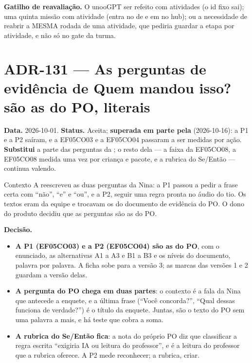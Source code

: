 \textbf{Gatilho de reavaliação.} O unooGPT ser refeito com atividades (o id fixo
 sai); uma quinta missão com atividade (entra no  de
 e em  no hub); ou a
necessidade de reabrir a MESMA rodada de uma atividade, que pediria guardar a
etapa por atividade, e não só no gate da turma.

\section{ADR-131 --- As perguntas de evidência de Quem mandou isso? são as do PO, literais}
\label{adr:perguntas-do-po-quem-mandou}

\textbf{Data.} 2026-10-01. \textbf{Status.} Aceita; \textbf{superada em parte
pela } (2026-10-16): a P1 e a P2 saíram, e a EF05CO03 e a
EF05CO04 passaram a ser medidas por ação. \textbf{Substitui} a parte
das perguntas da ; o resto dela --- a faixa da EF05CO08, a
EF05CO08 medida uma vez por criança e pacote, e a rubrica do Se/Então --- continua
valendo.

\begin{especificacao}{Contexto}
A  reescreveu as duas perguntas da Nina: a P1 passou a pedir a
frase certa com \enquote{não}, \enquote{e} e \enquote{ou}, e a P2, seguir uma
regra pronta no áudio do tio. Os textos eram da equipe e trocavam os do
documento de evidência do PO. O dono do produto decidiu que as perguntas são
as do PO.
\end{especificacao}

\textbf{Decisão.}

\begin{itemize}
  \item \textbf{A P1 (EF05CO03) e a P2 (EF05CO04) são as do PO}, com o
    enunciado, as alternativas A1 a A3 e B1 a B3 e os níveis do documento,
    palavra por palavra. A ficha sobe para a versão 3; as marcas das versões 1
    e 2 guardam a versão delas.
  \item \textbf{A pergunta do PO chega em duas partes}: o contexto é a fala da
    Nina que antecede a enquete, e a última frase (\enquote{Você concorda?},
    \enquote{Qual dessas funciona de verdade?}) é o título da enquete. Juntas,
    são o texto do PO sem uma palavra a mais, e há teste que cobra a soma.
  \item \textbf{A rubrica do Se/Então fica}: a nota do próprio PO diz que
    classificar a regra escrita \enquote{exigiria IA ou leitura do professor},
    e é a leitura do professor que a rubrica oferece. A P2 mede reconhecer; a
    rubrica, criar.
\end{itemize}

